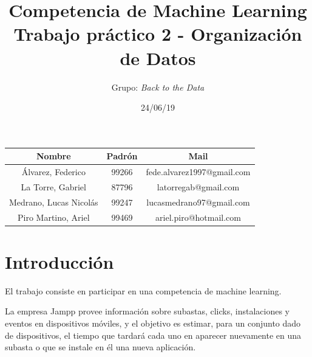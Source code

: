 \documentclass[a4paper, 12pt]{article}
\title{Competencia de Machine Learning \\ Trabajo práctico 2 - Organización de Datos}
\author{Grupo: \textit{Back to the Data}}
\date{24/06/19}
\begin{document}
\begin{figure}
    \centering
\end{figure}
\maketitle

\FloatBarrier
\begin{center}
	\begin{adjustbox}{width=1\textwidth}
        \begin{tabular}{ |c|c|c| }
          \hline
          Nombre & Padrón & Mail \\
          \hline\hline
          Álvarez, Federico & 99266 & fede.alvarez1997@gmail.com \\
          \hline
          La Torre, Gabriel & 87796 & latorregab@gmail.com \\
          \hline
          Medrano, Lucas Nicolás & 99247 & lucasmedrano97@gmail.com \\
          \hline
          Piro Martino, Ariel & 99469 & ariel.piro@hotmail.com \\
          \hline
       	 \end{tabular}
       \end{adjustbox}
\end{center}
\FloatBarrier

\newpage

\tableofcontents
\newpage

\section{Introducción}
El trabajo consiste en participar en una competencia de machine learning. 

La empresa Jampp provee información sobre subastas, clicks, instalaciones y eventos en dispositivos móviles, y el objetivo es estimar, para un conjunto dado de dispositivos, el tiempo que tardará cada uno en aparecer nuevamente en una
subasta o que se instale en él una nueva aplicación.
\end{document}
